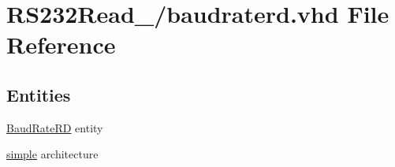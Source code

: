 \hypertarget{16_2baudraterd_8vhd}{}\section{R\+S232\+Read\+\_/baudraterd.vhd File Reference}
\label{16_2baudraterd_8vhd}
\subsection*{Entities}
\begin{DoxyCompactItemize}
\item 
\hyperlink{class_baud_rate_r_d}{Baud\+Rate\+R\+D} entity
\item 
\hyperlink{class_baud_rate_r_d_1_1simple}{simple} architecture
\end{DoxyCompactItemize}
